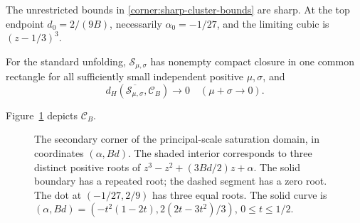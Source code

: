 \begin{proposition}
\begin{enumerate}
The unrestricted bounds in \eqref{corner:sharp-cluster-bounds} are sharp.
At the top endpoint $d_0=2/(9B)$, necessarily
$\alpha_0=-1/27$, and the limiting cubic is $(z-1/3)^3$.

For the standard unfolding, $\mathscr S_{\mu,\sigma}$ has nonempty compact
closure in one common rectangle for all sufficiently small independent
positive $\mu,\sigma$, and
\begin{equation}\label{eq:main-Hausdorff}
 d_H(\overline{\mathscr S_{\mu,\sigma}},\mathcal C_B)\longrightarrow0
 \quad(\mu+\sigma\to0).
\end{equation}
\end{enumerate}
\end{proposition}

Figure~\ref{fig:corner-limit-set} depicts $\mathcal C_B$.

\begin{figure}[htbp]
\centering

\caption{The secondary corner of the principal-scale saturation domain, in coordinates \((\alpha,Bd)\).
The shaded interior corresponds to three distinct positive roots of
\(z^3-z^2+(3Bd/2)z+\alpha\). The solid boundary has a repeated root;
the dashed segment has a zero root. The dot at
\((-1/27,2/9)\) has three equal roots. The solid curve is
\((\alpha,Bd)=(-t^2(1-2t),2(2t-3t^2)/3)\), \(0\le t\le1/2\).
}
\label{fig:corner-limit-set}
\end{figure}

